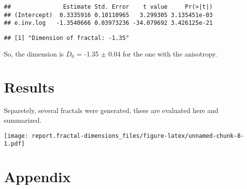 \documentclass[]{article}
\newenvironment{Shaded}{\begin{snugshade}}{\end{snugshade}}
\newcommand{\DataTypeTok}[1]{\textcolor[rgb]{0.13,0.29,0.53}{#1}}
\newcommand{\DecValTok}[1]{\textcolor[rgb]{0.00,0.00,0.81}{#1}}
\newcommand{\KeywordTok}[1]{\textcolor[rgb]{0.13,0.29,0.53}{\textbf{#1}}}
\newcommand{\NormalTok}[1]{#1}
\newcommand{\OperatorTok}[1]{\textcolor[rgb]{0.81,0.36,0.00}{\textbf{#1}}}
\newcommand{\StringTok}[1]{\textcolor[rgb]{0.31,0.60,0.02}{#1}}
\begin{document}
\begin{verbatim}
##               Estimate Std. Error    t value     Pr(>|t|)
## (Intercept)  0.3335916 0.10110965   3.299305 3.135451e-03
## e.inv.log   -1.3540666 0.03973236 -34.079692 3.426125e-21
\end{verbatim}

\begin{Shaded}
\end{Shaded}

\begin{verbatim}
## [1] "Dimension of fractal: -1.35"
\end{verbatim}

So, the dimension is \(D_0\) = -1.35 \(\pm\) 0.04 for the one with the
anisotropy.

\hypertarget{results}{%
\section{Results}\label{results}}

Separetely, several fractals were generated, these are evaluated here
and summarized.

\begin{Shaded}
\end{Shaded}

\texttt{[image: report.fractal-dimensions\_files/figure-latex/unnamed-chunk-8-1.pdf]}

\hypertarget{appendix}{%
\section{Appendix}\label{appendix}}
\end{document}
